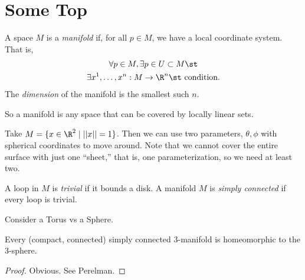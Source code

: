 \documentclass{notes}
\begin{document}
\section*{Some Top}
\begin{defn}[Manifold]
  A space $M$ is a \emph{manifold} if, for all $p\in M$, we have a local coordinate system. That is, 
  \begin{gather*}
    \forall p\in M, \exists p\in U\subset M \st \\
    \exists  x^1, \ldots, x^n: M \to \R^n \st \text{ condition}.
  \end{gather*}
  The \emph{dimension} of the manifold is the smallest such $n$.
\end{defn}
So a manifold is any space that can be covered by locally linear sets.
\begin{example}
  Take $M = \{x\in \R^2 \mid ||x|| = 1\}$. Then we can use two parameters, $\theta, \phi$ with
  spherical coordinates to move around. Note that we cannot cover the entire surface with just one
  ``sheet,''  that is, one parameterization, so we need at least two.
\end{example}

\begin{defn}
  A loop in $M$ is \emph{trivial} if it bounds a disk. A manifold $M$ is \emph{simply connected} if
  every loop is trivial.
\end{defn}
\begin{example}
  Consider a Torus vs a Sphere.
\end{example}

\begin{theorem}
  Every (compact, connected) simply connected 3-manifold is homeomorphic to the 3-sphere. 
\end{theorem}
\begin{proof}
  Obvious. See Perelman.
\end{proof}
\end{document}
